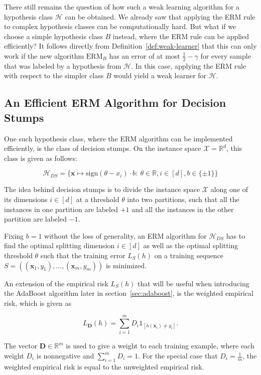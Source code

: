 There still remains the question of how such a weak learning algorithm for a hypothesis class $\mathcal{H}$
can be obtained.
We already saw that applying the ERM rule to complex hypothesis classes can be computationally hard.
But what if we choose a simple hypothesis class $B$ instead, where the ERM rule can be applied efficiently?
It follows directly from Definition~\ref{def:weak-learner} that this can only work if the new algorithm
$\text{ERM}_B$ has an error of at most $\frac{1}{2} - \gamma$ for every sample that was labeled by a hypothesis from
$\mathcal{H}$. In this case, applying the ERM rule with respect to the simpler class $B$ would yield a weak learner
for $\mathcal{H}$.

\subsection{An Efficient ERM Algorithm for Decision Stumps}

One such hypothesis class, where the ERM algorithm can be implemented efficiently, is the class of decision stumps.
On the instance space $\mathcal{X} = \mathbb{R}^d$,  this class is given as follows:
\begin{linenomath*}
    $$\mathcal{H}_{DS} = \{ \mathbf{x} \mapsto \text{sign}\left( \theta - x_i \right) \cdot b: \ 
        \theta \in \mathbb{R}, i \in \left[ d \right], b \in \{ \pm 1 \} \}$$
\end{linenomath*}

The idea behind decision stumps is to divide the instance space $\mathcal{X}$ along one of its dimensions
$i \in \left[ d \right]$ at a threshold $\theta$ into two partitions, 
such that all the instances in one partition are labeled
$+1$ and all the instances in the other partition are labeled $-1$.

Fixing $b=1$ without the loss of generality,
an ERM algorithm for $\mathcal{H}_{DS}$ has to find the optimal splitting dimension $i \in \left[ d \right]$ as well
as the optimal splitting threshold $\theta$ such that the training error $L_S(h)$ on a training sequence
$S = \left( (\mathbf{x}_1, y_1),...,(\mathbf{x}_m, y_m) \right)$ is minimized.

An extension of the empirical risk $L_S(h)$ that will be useful when introducing the AdaBoost algorithm later in
section~\ref{sec:adaboost}, is the weighted empirical risk, which is given as
\begin{linenomath*}
    $$L_\mathbf{D}(h) = \sum_{i=1}^{m} D_i \mathds{1}_{\left[ h(\mathbf{x}_i) \neq y_i \right]}.$$
\end{linenomath*}
The vector $\mathbf{D} \in \mathbb{R}^m$ is used to give a weight to each training example, where each
weight $D_i$ is nonnegative and $\sum_{i=1}^m D_i = 1$. For the special case that $D_i = \frac{1}{m}$, the
weighted empirical risk is equal to the unweighted empirical risk.


